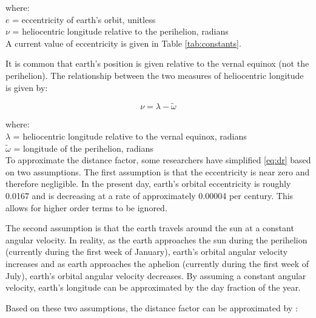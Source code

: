 \noindent where: \\
\indent $e$ = eccentricity of earth's orbit, unitless \\
\indent $\nu$ = heliocentric longitude relative to the perihelion, radians \\

\noindent A current value of eccentricity is given in Table \ref{tab:constants}.

It is common that earth's position is given relative to the vernal equinox (not the perihelion). 
The relationship between the two measures of heliocentric longitude is given by:

\begin{equation}
\label{eq:nu}
    \nu = \lambda - \tilde{\omega}
\end{equation}

\noindent where: \\
\indent $\lambda$ = heliocentric longitude relative to the vernal equinox, radians \\
\indent $\tilde{\omega}$ = longitude of the perihelion, radians\\

To approximate the distance factor, some researchers have simplified \ref{eq:dr} based on two assumptions. 
The first assumption is that the eccentricity is near zero and therefore negligible. 
In the present day, earth's orbital eccentricity is roughly 0.0167 and is decreasing at a rate of approximately 0.00004 per century\footnotemark {}. 
This allows for higher order terms to be ignored. 

The second assumption is that the earth travels around the sun at a constant angular velocity. 
In reality, as the earth approaches the sun during the perihelion (currently during the first week of January), earth's orbital angular velocity increases and as earth approaches the aphelion (currently during the first week of July), earth's orbital angular velocity decreases. 
By assuming a constant angular velocity, earth's longitude can be approximated by the day fraction of the year.

Based on these two assumptions, the distance factor can be approximated by \parencite{klein77}:

